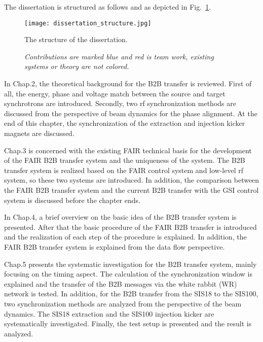 The dissertation is structured as follows and as depicted in Fig.~\ref{dissertation_structure}.
\begin{figure}[!htb]
   \centering   
   \texttt{[image: dissertation\_structure.jpg]}
   \caption{The structure of the dissertation.}
	\caption*{\textsl{\small{Contributions are marked blue and red is team work, existing systems or theory are not colored.}}}
   \label{dissertation_structure}
\end{figure}

In Chap.2, the theoretical background for the B2B transfer is reviewed. First of all, the energy, phase and voltage match between the source and target synchrotrons are introduced. Secondly, two rf synchronization methods are discussed from the perspective of beam dynamics for the phase alignment. At the end of this chapter, the synchronization of the extraction and injection kicker magnets are discussed.

Chap.3 is concerned with the existing FAIR technical basis for the development of the FAIR B2B transfer system and the uniqueness of the system. The B2B transfer system is realized based on the FAIR control system and low-level rf system, so these two systems are introduced. In addition, the comparison between the FAIR B2B transfer system and the current B2B transfer with the GSI control system is discussed before the chapter ends. 

In Chap.4, a brief overview on the basic idea of the B2B transfer system is presented. After that the basic procedure of the FAIR B2B transfer is introduced and the realization of each step of the procedure is explained. In addition, the FAIR B2B transfer system is explained from the data flow perspective.

Chap.5 presents the systematic investigation for the B2B transfer system, mainly focusing on the timing aspect. The calculation of the synchronization window is explained and the transfer of the B2B messages via the white rabbit (WR) network is tested. In addition, for the B2B transfer from the SIS18 to the SIS100, two synchronization methods are analyzed from the perspective of the beam dynamics. The SIS18 extraction and the SIS100 injection kicker are systematically investigated. Finally, the test setup is presented and the result is analyzed.

